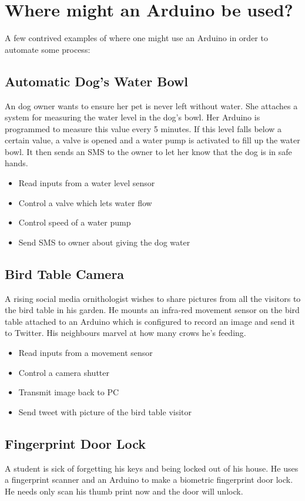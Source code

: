 \section*{Where might an Arduino be used?}
A few contrived examples of where one might use an Arduino in order to automate some process:

\subsection*{Automatic Dog's Water Bowl}
An dog owner wants to ensure her pet is never left without water. She attaches a system for measuring the water level in the dog's bowl. Her \gls{Arduino} is programmed to measure this value every 5 minutes. If this level falls below a certain value, a valve is opened and a water pump is activated to fill up the water bowl. It then sends an SMS to the owner to let her know that the dog is in safe hands.

\begin{itemize}
	\item Read inputs from a water level sensor
	\item Control a valve which lets water flow
	\item Control speed of a water pump 
	\item Send SMS to owner about giving the dog water
\end{itemize}

\subsection*{Bird Table Camera}
A rising social media ornithologist wishes to share pictures from all the visitors to the bird table in his garden. He mounts an infra-red movement sensor on the bird table attached to an \gls{Arduino} which is configured to record an image and send it to Twitter. His neighbours marvel at how many crows he's feeding.

\begin{itemize}
	\item Read inputs from a movement sensor
	\item Control a camera shutter
	\item Transmit image back to PC
	\item Send tweet with picture of the bird table visitor
\end{itemize}

\subsection*{Fingerprint Door Lock}
A student is sick of forgetting his keys and being locked out of his house. He uses a fingerprint scanner and an Arduino to make a biometric fingerprint door lock. He needs only scan his thumb print now and the door will unlock.

